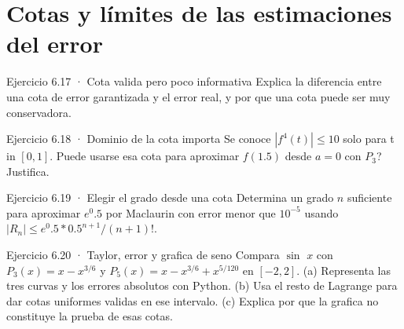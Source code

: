 \documentclass[10pt,a4paper,oneside,openany]{book}
\begin{document}
\section{Cotas y límites de las estimaciones del error}
\begin{PSevenExerciseFixed}{Ejercicio 6.17 · Cota valida pero poco informativa}
Explica la diferencia entre una cota de error garantizada y el error real, y por que una cota puede ser muy conservadora.
\end{PSevenExerciseFixed}
\begin{PSevenExerciseFixed}{Ejercicio 6.18 · Dominio de la cota importa}
Se conoce \(|f^{4}(t)|\le 10\) solo para t in \([0,1]\). Puede usarse esa cota para aproximar \(f(1.5)\) desde \(a=0\) con \(P_3\)? Justifica.
\end{PSevenExerciseFixed}
\begin{PSevenExerciseFixed}{Ejercicio 6.19 · Elegir el grado desde una cota}
Determina un grado \(n\) suficiente para aproximar \(e^{0}.5\) por Maclaurin con error menor que \(10^{-5}\) usando \(|R_n|\le e^{0}.5*0.5^{n+1}/(n+1)!\).
\end{PSevenExerciseFixed}
\begin{PSevenExerciseFixed}{Ejercicio 6.20 · Taylor, error y grafica de seno}
Compara \(\sin\) \(x\) con \(P_3(x)=x-x^{3/6}\) y \(P_5(x)=x-x^{3/6}+x^{5/120}\) en \([-2,2]\). (a) Representa las tres curvas y los errores absolutos con Python. (b) Usa el resto de Lagrange para dar cotas uniformes validas en ese intervalo. (c) Explica por que la grafica no constituye la prueba de esas cotas.
\end{PSevenExerciseFixed}
\end{document}
